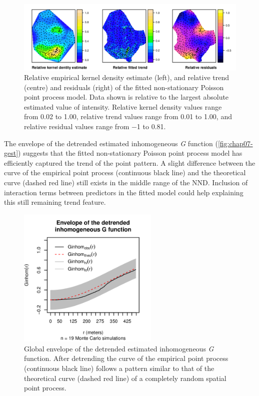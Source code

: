 \begin{figure}[!h]
 \centering
 \includegraphics[width=\textwidth]{fig/chap07-kernel-trend-res}
 \caption[Relative empirical kernel density estimate, and relative trend and residuals of the fitted 
non-stationary Poisson point process model.]{Relative empirical kernel density estimate (left), and relative 
trend (centre) and residuals (right) of the fitted non-stationary Poisson point process model. Data shown is 
relative to the largest absolute estimated value of intensity. Relative kernel density values range from 
\num{0.02} to \num{1.00}, relative trend values range from \num{0.01} to \num{1.00}, and relative residual 
values range from \num{-1} to \num{0.81}.}
\label{fig:chap07-trend}
\end{figure}

The envelope of the detrended estimated inhomogeneous \emph{G} function (\autoref{fig:chap07-gest}) suggests 
that the fitted non-stationary Poisson point process model has efficiently captured the trend of the point 
pattern. A slight difference between the curve of the empirical point process (continuous black line) and the 
theoretical curve (dashed red line) still exists in the middle range of the NND. Inclusion of interaction terms 
between predictors in the fitted model could help explaining this still 
remaining trend feature.

\begin{figure}[!h]
 \centering
 \includegraphics[trim=0mm 0mm 0mm 35mm, clip=true, width=0.6\textwidth]{fig/chap07-fit-gest-sim}
 \caption[Global envelope of the detrended estimated inhomogeneous \emph{G} function.]{Global envelope of the 
detrended estimated inhomogeneous \emph{G} function. After detrending the curve of the empirical point process 
(continuous black line) follows a pattern similar to that of the theoretical curve (dashed red line) of a 
completely random spatial point process.}
\label{fig:chap07-trend}
\end{figure}

